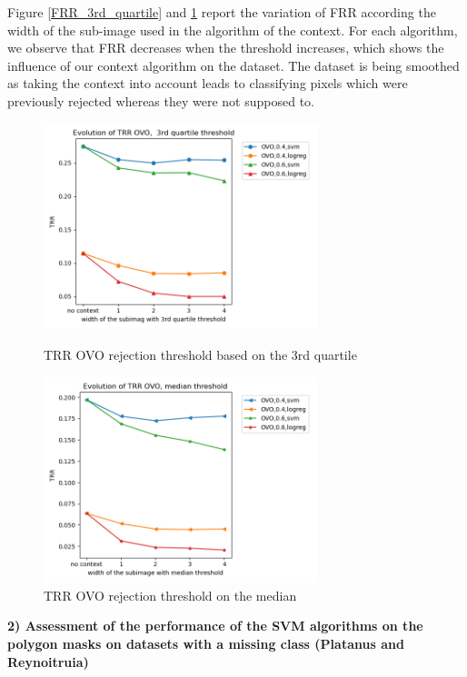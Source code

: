 \documentclass{siamart171218}
\begin{document}
Figure \ref{FRR_3rd_quartile} and \ref{FRR_median} report the variation of FRR according the width of the sub-image used in the algorithm of the context. For each algorithm, we observe that FRR decreases when the threshold increases, which shows the influence of our context algorithm on the dataset. The dataset is being smoothed as taking the context into account leads to classifying pixels which were previously rejected whereas they were not supposed to. \\

\begin{figure}[h!]
    \begin{minipage}[c]{.46\linewidth}
        \centering
        \includegraphics[width=8cm]{images/TRR_OVO_quartile.png}
        \caption{TRR OVO rejection threshold based on the 3rd quartile}
        \label{FRR_3rd_quartile}
    \end{minipage}
    \hfill
    \begin{minipage}[c]{.46\linewidth}
        \centering
        \includegraphics[width=8cm]{images/TRR_OVO_median.png}
        \caption{TRR OVO rejection threshold on the median}
        \label{FRR_median}
    \end{minipage}
    \hfill
\end{figure}

\textbf{2) Assessment of the performance of the SVM algorithms on the polygon masks on datasets with a missing class (Platanus and Reynoitruia)}
\end{document}
